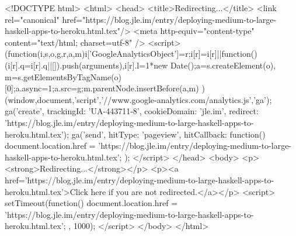<!DOCTYPE html>
<html>
<head>
<title>Redirecting...</title>
<link rel="canonical" href="https://blog.jle.im/entry/deploying-medium-to-large-haskell-apps-to-heroku.html.tex"/>
<meta http-equiv="content-type" content="text/html; charset=utf-8" />
<script>
(function(i,s,o,g,r,a,m){i['GoogleAnalyticsObject']=r;i[r]=i[r]||function(){
(i[r].q=i[r].q||[]).push(arguments)},i[r].l=1*new Date();a=s.createElement(o),
m=s.getElementsByTagName(o)[0];a.async=1;a.src=g;m.parentNode.insertBefore(a,m)
})(window,document,'script','//www.google-analytics.com/analytics.js','ga');
ga('create', { trackingId: 'UA-443711-8', cookieDomain: 'jle.im', redirect: 'https://blog.jle.im/entry/deploying-medium-to-large-haskell-apps-to-heroku.html.tex'});
ga('send', { hitType: 'pageview', hitCallback: function() { document.location.href = 'https://blog.jle.im/entry/deploying-medium-to-large-haskell-apps-to-heroku.html.tex'; } });
</script>
</head>
<body>
  <p><strong>Redirecting...</strong></p>
  <p><a href='https://blog.jle.im/entry/deploying-medium-to-large-haskell-apps-to-heroku.html.tex'>Click here if you are not redirected.</a></p>
  <script>
    setTimeout(function() { document.location.href = 'https://blog.jle.im/entry/deploying-medium-to-large-haskell-apps-to-heroku.html.tex'; }, 1000);
  </script>
</body>
</html>
